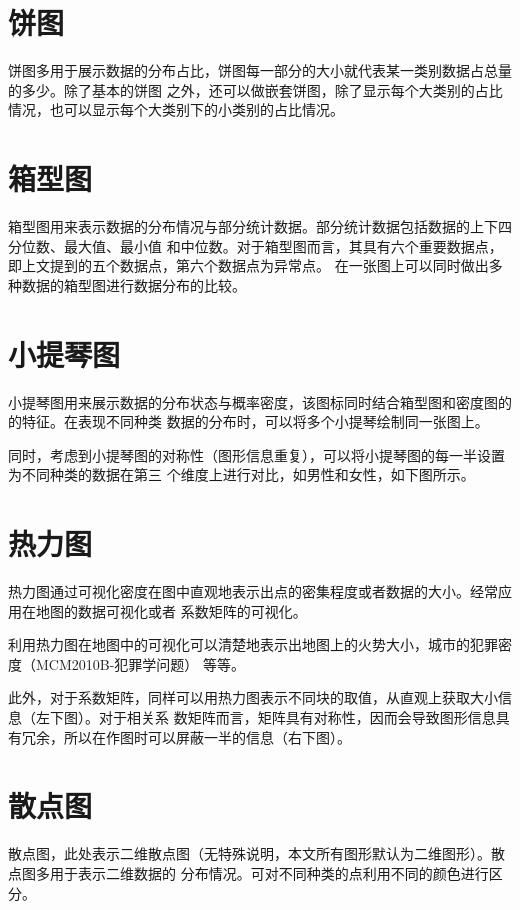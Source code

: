 \documentclass{introduction}
\begin{document}
	\section{饼图}
	饼图多用于展示数据的分布占比，饼图每一部分的大小就代表某一类别数据占总量的多少。除了基本的饼图
	之外，还可以做嵌套饼图，除了显示每个大类别的占比情况，也可以显示每个大类别下的小类别的占比情况。
	\parainterval 

	\newpage
	\section{箱型图}
	箱型图用来表示数据的分布情况与部分统计数据。部分统计数据包括数据的上下四分位数、最大值、最小值
	和中位数。对于箱型图而言，其具有六个重要数据点，即上文提到的五个数据点，第六个数据点为异常点。
	在一张图上可以同时做出多种数据的箱型图进行数据分布的比较。

	\section{小提琴图}
	小提琴图用来展示数据的分布状态与概率密度，该图标同时结合箱型图和密度图的的特征。在表现不同种类
	数据的分布时，可以将多个小提琴绘制同一张图上。

	同时，考虑到小提琴图的对称性（图形信息重复），可以将小提琴图的每一半设置为不同种类的数据在第三
	个维度上进行对比，如男性和女性，如下图所示。

	\section{热力图}
	热力图通过可视化密度在图中直观地表示出点的密集程度或者数据的大小。经常应用在地图的数据可视化或者
	系数矩阵的可视化。

	利用热力图在地图中的可视化可以清楚地表示出地图上的火势大小，城市的犯罪密度（MCM2010B-犯罪学问题）
	等等。

	此外，对于系数矩阵，同样可以用热力图表示不同块的取值，从直观上获取大小信息（左下图）。对于相关系
	数矩阵而言，矩阵具有对称性，因而会导致图形信息具有冗余，所以在作图时可以屏蔽一半的信息（右下图）。

	\section{散点图}
	散点图，此处表示二维散点图（无特殊说明，本文所有图形默认为二维图形）。散点图多用于表示二维数据的
	分布情况。可对不同种类的点利用不同的颜色进行区分。
\end{document}
